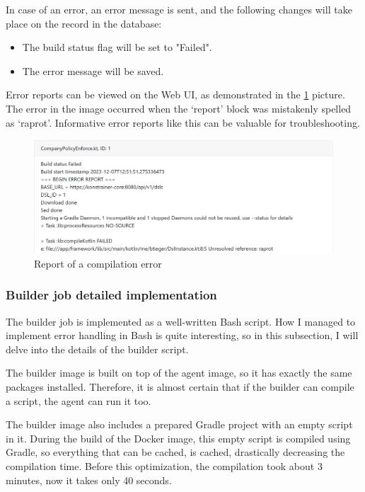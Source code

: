 In case of an error, an error message is sent, and the following changes will take place on the record in the database:

\begin{itemize}
    \item The build status flag will be set to "Failed".
    \item The error message will be saved.
\end{itemize}

Error reports can be viewed on the Web UI, as demonstrated in the \ref{fig:err_Rep} picture. The error in the image occurred when the `report' block was mistakenly spelled as `raprot'. Informative error reports like this can be valuable for troubleshooting.

\begin{figure}[h]
  \centering
  \includegraphics[width=150mm, keepaspectratio]{build_err.png}
  \caption{Report of a compilation error}
  \label{fig:err_Rep}
\end{figure}

\subsubsection{Builder job detailed implementation}

The builder job is implemented as a well-written Bash script. How I managed to implement error handling in Bash is quite interesting, so in this subsection, I will delve into the details of the builder script.

The builder image is built on top of the agent image, so it has exactly the same packages installed. Therefore, it is almost certain that if the builder can compile a script, the agent can run it too.

The builder image also includes a prepared Gradle project with an empty script in it. During the build of the Docker image, this empty script is compiled using Gradle, so everything that can be cached, is cached, drastically decreasing the compilation time. Before this optimization, the compilation took about 3 minutes, now it takes only 40 seconds.

